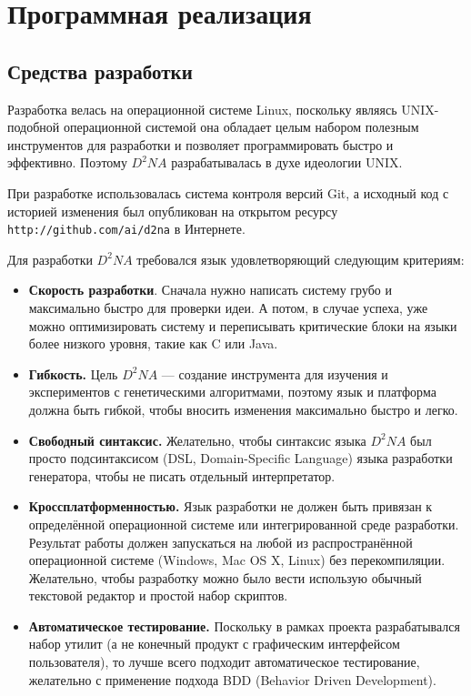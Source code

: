\documentclass[utf8,a5paper,portrait,12pt]{eskdtext}
\begin{document}
\newpage
\section{Программная реализация}

\subsection{Средства разработки}

Разработка велась на операционной системе Linux, поскольку являясь UNIX-подобной
операционной системой она обладает целым набором полезным инструментов для
разработки и позволяет программировать быстро и эффективно. Поэтому $D^2NA$
разрабатывалась в духе идеологии UNIX.

При разработке использовалась система контроля версий Git, а исходный код с
историей изменения был опубликован на открытом ресурсу
\texttt{http://github.com/ai/d2na} в Интернете.

Для разработки $D^2NA$ требовался язык удовлетворяющий следующим критериям:
\begin{itemize}
  \item \textbf{Скорость разработки}. Сначала нужно написать систему грубо и
        максимально быстро для проверки идеи. А потом, в случае успеха, уже
        можно оптимизировать систему и переписывать критические блоки на языки
        более низкого уровня, такие как C или Java.
  \item \textbf{Гибкость.} Цель $D^2NA$ — создание инструмента для изучения и
        экспериментов с генетическими алгоритмами, поэтому язык и платформа
        должна быть гибкой, чтобы вносить изменения максимально быстро и легко.
  \item \textbf{Свободный синтаксис.} Желательно, чтобы синтаксис языка $D^2NA$ был
        просто подсинтаксисом (DSL, Domain-Specific Language) языка разработки
        генератора, чтобы не писать отдельный интерпретатор.
  \item \textbf{Кроссплатформенностью.} Язык разработки не должен быть привязан к
        определённой операционной системе или интегрированной среде разработки.
        Результат работы должен запускаться на любой из распространённой
        операционной системе (Windows, Mac OS X, Linux) без перекомпиляции.
        Желательно, чтобы разработку можно было вести использую обычный
        текстовой редактор и простой набор скриптов.
  \item \textbf{Автоматическое тестирование.} Поскольку в рамках проекта
        разрабатывался набор утилит (а не конечный продукт с графическим
        интерфейсом пользователя), то лучше всего подходит автоматическое
        тестирование, желательно с применение подхода BDD (Behavior Driven
        Development).
\end{itemize}
\end{document}
